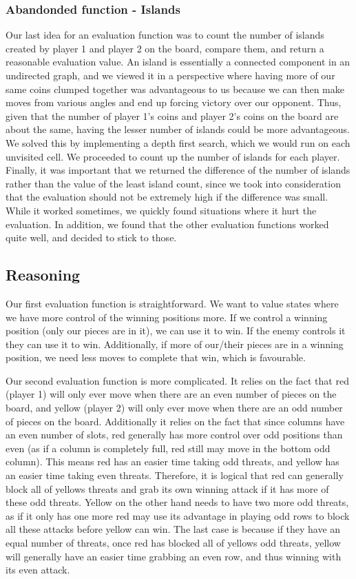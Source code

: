 \documentclass{article}
\begin{document}
\subsubsection{Abandonded function - Islands}
Our last idea for an evaluation function was to count the number of islands created by player 1 and player 2 on the board, compare them, and return a reasonable evaluation value. An island is essentially a connected component in an undirected graph, and we viewed it in a perspective where having more of our same coins clumped together was advantageous to us because we can then make moves from various angles and end up forcing victory over our opponent. Thus, given that the number of player 1's coins and player 2's coins on the board are about the same, having the lesser number of islands could be more advantageous. We solved this by implementing a depth first search, which we would run on each unvisited cell. We proceeded to count up the number of islands for each player. Finally, it was important that we returned the difference of the number of islands rather than the value of the least island count, since we took into consideration that the evaluation should not be extremely high if the difference was small. While it worked sometimes, we quickly found situations where it hurt the evaluation. In addition, we found that the other evaluation functions worked quite well, and decided to stick to those. 

\subsection{Reasoning}
\label{ssec:reasoning}
Our first evaluation function is straightforward. We want to value states where we have more control of the winning positions more. If we control a winning position (only our pieces are in it), we can use it to win. If the enemy controls it they can use it to win. Additionally, if more of our/their pieces are in a winning position, we need less moves to complete that win, which is favourable.
		
Our second evaluation function is more complicated. It relies on the fact that red (player 1) will only ever move when there are an even number of pieces on the board, and yellow (player 2) will only ever move when there are an odd number of pieces on the board. Additionally it relies on the fact that since columns have an even number of slots, red generally has more control over odd positions than even (as if a column is completely full, red still may move in the bottom odd column). This means red has an easier time taking odd threats, and yellow has an easier time taking even threats. Therefore, it is logical that red can generally block all of yellows threats and grab its own winning attack if it has more of these odd threats. Yellow on the other hand needs to have two more odd threats, as if it only has one more red may use its advantage in playing odd rows to block all these attacks before yellow can win. The last case is because if they have an equal number of threats, once red has blocked all of yellows odd threats, yellow will generally have an easier time grabbing an even row, and thus winning with its even attack.
		
\end{document}
